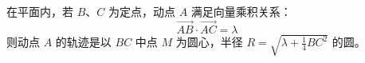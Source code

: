 \begin{statementbox}
在平面内，若 $B$、$C$ 为定点，动点 $A$ 满足向量乘积关系：
\[ \vec{AB} \cdot \vec{AC} = \lambda \]
则动点 $A$ 的轨迹是以 $BC$ 中点 $M$ 为圆心，半径 $R = \sqrt{\lambda + \frac{1}{4}BC^2}$ 的圆。
\end{statementbox}
